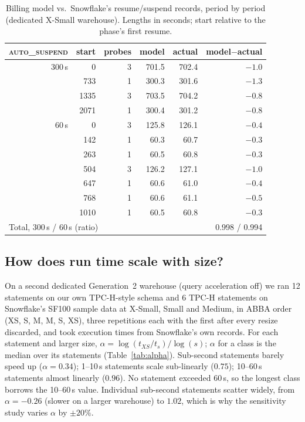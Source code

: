 \documentclass[conference]{IEEEtran}
\newcommand{\autos}{\textsc{auto\_suspend}}
\begin{document}
\begin{table}[t]
\caption{Billing model vs.\ Snowflake's resume/suspend records, period by period (dedicated X-Small warehouse). Lengths in
seconds; start relative to the phase's first resume.}\label{tab:f1}
\centering\scriptsize
\setlength{\tabcolsep}{4pt}
\begin{tabular}{rrrrrr}
\toprule
\autos & start & probes & model & actual & model$-$actual \\
\midrule
300\,s & 0     & 3 & 701.5 & 702.4 & $-1.0$ \\
       & 733   & 1 & 300.3 & 301.6 & $-1.3$ \\
       & 1335  & 3 & 703.5 & 704.2 & $-0.8$ \\
       & 2071  & 1 & 300.4 & 301.2 & $-0.8$ \\
\midrule
60\,s  & 0     & 3 & 125.8 & 126.1 & $-0.4$ \\
       & 142   & 1 & 60.3  & 60.7  & $-0.3$ \\
       & 263   & 1 & 60.5  & 60.8  & $-0.3$ \\
       & 504   & 3 & 126.2 & 127.1 & $-1.0$ \\
       & 647   & 1 & 60.6  & 61.0  & $-0.4$ \\
       & 768   & 1 & 60.6  & 61.1  & $-0.5$ \\
       & 1010  & 1 & 60.5  & 60.8  & $-0.3$ \\
\midrule
\multicolumn{3}{l}{Total, 300\,s / 60\,s (ratio)} & \multicolumn{3}{r}{0.998 / 0.994} \\
\bottomrule
\end{tabular}
\end{table}

\subsection{How does run time scale with size?}
On a second dedicated Generation~2 warehouse (query acceleration off) we ran 12 statements on our own TPC-H-style
schema and 6 TPC-H statements on Snowflake's SF100 sample data at X-Small, Small and Medium, in ABBA order (XS, S, M, M, S,
XS), three repetitions each with the first after every resize discarded, and took execution times from Snowflake's own
records. For each statement and larger size, $\alpha = \log(t_{XS}/t_{s})/\log(s)$; $\alpha$ for a class is the median over
its statements (Table~\ref{tab:alpha}). Sub-second statements barely speed up ($\alpha = 0.34$); 1--10\,s statements
scale sub-linearly ($0.75$); 10--60\,s statements almost linearly ($0.96$). No statement exceeded 60\,s, so the longest class
borrows the 10--60\,s value. Individual sub-second statements scatter widely, from $\alpha = -0.26$ (slower on a larger
warehouse) to $1.02$, which is why the sensitivity study varies $\alpha$ by $\pm20\%$.
\end{document}
